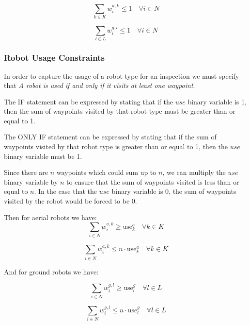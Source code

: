 \documentclass{article}
\begin{document}
				\begin{equation}
				\sum_{k \in K} w_i^{a,k} \leq 1 \quad \forall i \in N
				\end{equation}

				\begin{equation}
				\sum_{l \in L} w_i^{g,l} \leq 1 \quad \forall i \in N
				\end{equation}

			\subsubsection{Robot Usage Constraints}

				In order to capture the usage of a robot type for an inspection we must specify that \textit{A robot is used if and only if it visits at least one waypoint}.

				The IF statement can be expressed by stating that if the $use$ binary variable is 1, then the sum of waypoints visited by that robot type must be greater than or equal to 1.

				The ONLY IF statement can be expressed by stating that if the sum of waypoints visited by that robot type is greater than or equal to 1, then the $use$ binary variable must be 1. 

				Since there are $n$ waypoints which could sum up to $n$, we can multiply the $use$ binary variable by $n$ to ensure that the sum of waypoints visited is less than or equal to $n$. In the case that the $use$ binary variable is 0, the sum of waypoints visited by the robot would be forced to be 0.

				Then for aerial robots we have:
				\begin{equation}
				\sum_{i \in N} w_i^{a,k} \geq \text{use}_k^a \quad \forall k \in K
				\end{equation}

				\begin{equation}
				\sum_{i \in N} w_i^{a,k} \leq n \cdot \text{use}_k^a \quad \forall k \in K
				\end{equation}

				And for ground robots we have:

				\begin{equation}
				\sum_{i \in N} w_i^{g,l} \geq \text{use}_l^g \quad \forall l \in L
				\end{equation}

				\begin{equation}
				\sum_{i \in N} w_i^{g,l} \leq n \cdot \text{use}_l^g \quad \forall l \in L
				\end{equation}
\end{document}
